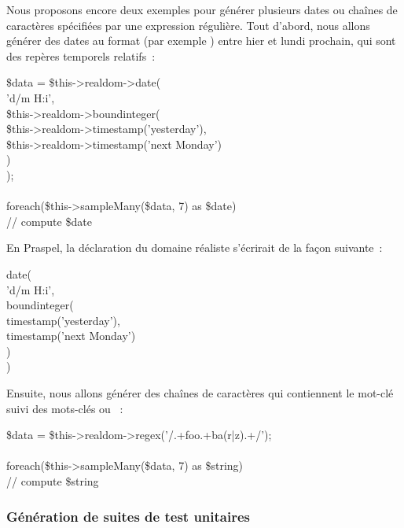 \begin{example}

Nous proposons encore deux exemples pour générer plusieurs dates ou chaînes de
caractères spécifiées par une expression régulière. Tout d'abord, nous allons
générer des dates au format  (par exemple )
entre hier et lundi prochain, qui sont des repères temporels relatifs~:

%
\begin{pre}
\$data = \$this->realdom->date( \\
    'd/m H:i', \\
    \$this->realdom->boundinteger( \\
        \$this->realdom->timestamp('yesterday'), \\
        \$this->realdom->timestamp('next Monday') \\
    ) \\
); \\
 \\
foreach(\$this->sampleMany(\$data, 7) as \$date) \\
    // compute \$date
\end{pre}
%
En Praspel, la déclaration du domaine réaliste s'écrirait de la façon suivante~:
%
\begin{pre}
date( \\
    'd/m H:i', \\
    boundinteger( \\
        timestamp('yesterday'), \\
        timestamp('next Monday') \\
    ) \\
)
\end{pre}
%
Ensuite, nous allons générer des chaînes de caractères qui contiennent
le mot-clé  suivi des mots-clés  ou ~:
%
\begin{pre}
\$data = \$this->realdom->regex('/.+foo.+ba(r|z).+/'); \\
 \\
foreach(\$this->sampleMany(\$data, 7) as \$string) \\
    // compute \$string
\end{pre}

\end{example}

\subsubsection{Génération de suites de test unitaires}

